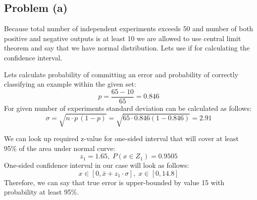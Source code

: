 \subsection*{Problem (a)}

Because total number of independent experiments exceeds 50 and number of both positive and negative outputs is at least 10 we are allowed to use central limit theorem and say that we have normal distribution. Lets use if for calculating the confidence interval.

Lets calculate probability of committing an error and probability of correctly classifying an example within the given set:
\[
p=\frac{65-10}{65}=0.846
\]
For given number of experiments standard deviation can be calculated as follows:
 \[
\sigma=\sqrt{n\cdot p\,(1-p)}=\sqrt{65\cdot 0.846(1-0.846)}=2.91
\]

We can look up required z-value for one-sided interval that will cover at least 95\% of the area under normal curve:
 \[
z_1=1.65,\; P(x\in Z_1)=0.9505
\]
One-sided confidence interval in our case will look as follows:
 \[
x\in [0, \bar{x}+z_1\cdot\sigma],\;
x\in [0, 14.8]
\]
Therefore, we can say that true error is upper-bounded by value 15 with probability at least 95\%.
